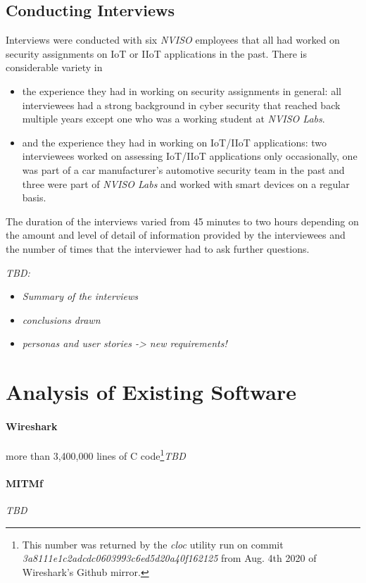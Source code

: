 \subsection{Conducting Interviews}
Interviews were conducted with six %
\emph{NVISO} employees that all had worked on security assignments on \ac{IoT} or \ac{IIoT} applications in the past. There is considerable variety in
\begin{itemize}
    \item the experience they had in working on security assignments in general: all interviewees had a strong background in cyber security that reached back multiple years except one who was a working student at \emph{NVISO Labs}.
    \item and the experience they had in working on \ac{IoT}/\ac{IIoT} applications: two interviewees worked on assessing \ac{IoT}/\ac{IIoT} applications only occasionally, one was part of a car manufacturer's automotive security team in the past and three were part of \emph{NVISO Labs} and worked with smart devices on a regular basis.
\end{itemize}
The duration of the interviews varied from 45 minutes to two hours depending on the amount and level of detail of information provided by the interviewees and the number of times that the interviewer had to ask further questions.

\emph{TBD:} %
\begin{itemize}
    \item \emph{Summary of the interviews}
    \item \emph{conclusions drawn}
    \item \emph{personas and user stories -> new requirements!}
\end{itemize}

\section{Analysis of Existing Software}
\paragraph{Wireshark} more than 3,400,000 lines of C code\footnote{This number was returned by the \emph{cloc} utility run on commit \emph{3a8111e1c2adcdc0603993c6ed5d20a40f162125} from Aug. 4th 2020 of Wireshark's Github mirror.}\emph{TBD}
\paragraph{MITMf} \emph{TBD}
